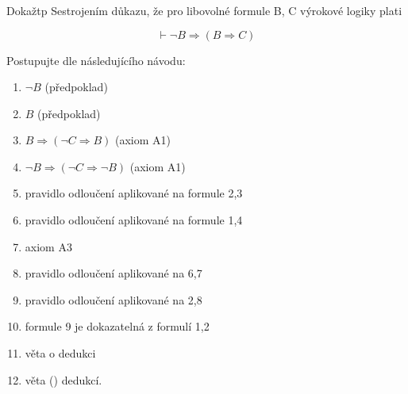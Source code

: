 \subsubsection{}
Dokažtp Sestrojením důkazu, že pro libovolné formule B, C výrokové
logiky plati

$$\vdash \neg B \Rightarrow (B \Rightarrow C)$$

Postupujte dle následujícího návodu:
\begin{enumerate}
  \item $\neg B$ (předpoklad)
  \item $B$ (předpoklad)
  \item $B \Rightarrow ( \neg C \Rightarrow B)$ (axiom A1)
  \item $\neg B \Rightarrow ( \neg C \Rightarrow \neg B)$ (axiom A1)
  \item pravidlo odloučení aplikované na formule 2,3
  \item pravidlo odloučení aplikované na formule 1,4
  \item axiom A3
  \item pravidlo odloučení aplikované na 6,7
  \item pravidlo odloučení aplikované na 2,8
  \item formule 9 je dokazatelná z formulí 1,2
  \item věta o dedukci
  \item věta () dedukcí.
\end{enumerate}
